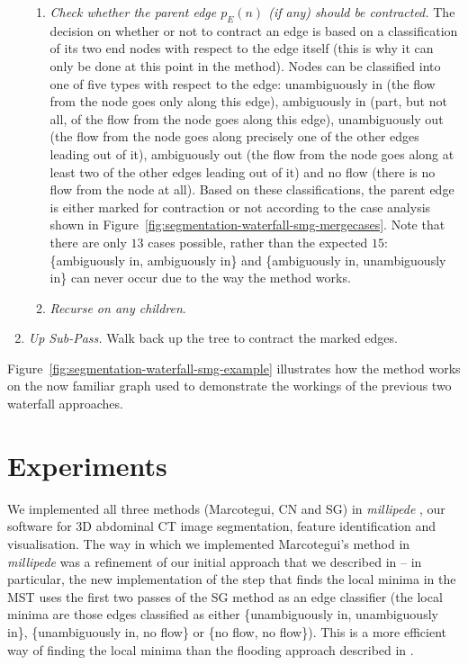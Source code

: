 \documentclass[preprint,a4paper]{elsarticle}
\begin{document}
\begin{enumerate}
\begin{enumerate}
\item \emph{Check whether the parent edge $p_E(n)$ (if any) should be contracted.} The decision on whether or not to contract an edge is based on a classification of its two end nodes with respect to the edge itself (this is why it can only be done at this point in the method). Nodes can be classified into one of five types with respect to the edge: unambiguously in (the flow from the node goes only along this edge), ambiguously in (part, but not all, of the flow from the node goes along this edge), unambiguously out (the flow from the node goes along precisely one of the other edges leading out of it), ambiguously out (the flow from the node goes along at least two of the other edges leading out of it) and no flow (there is no flow from the node at all). Based on these classifications, the parent edge is either marked for contraction or not according to the case analysis shown in Figure~\ref{fig:segmentation-waterfall-smg-mergecases}. Note that there are only $13$ cases possible, rather than the expected $15$: \{ambiguously in, ambiguously in\} and \{ambiguously in, unambiguously in\} can never occur due to the way the method works.

\item \emph{Recurse on any children}.
\end{enumerate}

\item \emph{Up Sub-Pass.} Walk back up the tree to contract the marked edges.

\end{enumerate}

\noindent Figure~\ref{fig:segmentation-waterfall-smg-example} illustrates how the method works on the now familiar graph used to demonstrate the workings of the previous two waterfall approaches.

\section{Experiments}
\label{sec:experiments}

We implemented all three methods (Marcotegui, CN and SG) in \emph{millipede} \cite{millipede}, our software for 3D abdominal CT image segmentation, feature identification and visualisation. The way in which we implemented Marcotegui's method in \emph{millipede} was a refinement of our initial approach that we described in \cite{golodetz08} -- in particular, the new implementation of the step that finds the local minima in the MST uses the first two passes of the SG method as an edge classifier (the local minima are those edges classified as either \{unambiguously in, unambiguously in\}, \{unambiguously in, no flow\} or \{no flow, no flow\}). This is a more efficient way of finding the local minima than the flooding approach described in \cite{golodetz08}.
\end{document}
